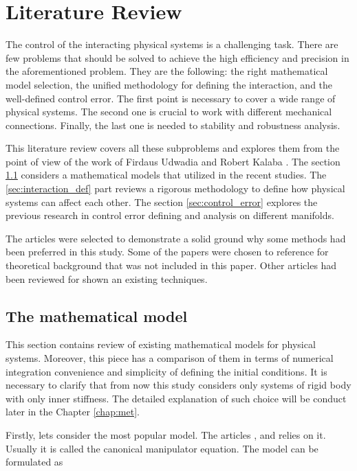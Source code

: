 \chapter{Literature Review}
\label{chap:lr}

The control of the interacting physical systems is a challenging 
task. There are few problems that should be solved to achieve the 
high efficiency and precision in the aforementioned problem. They 
are the following: the right mathematical model selection, the 
unified methodology for defining the interaction, and the well-defined 
control error. The first point is necessary to cover a wide range 
of physical systems. The second one is crucial to work with 
different mechanical connections. Finally, the last one is needed 
to stability and robustness analysis. 

This literature review covers all these subproblems and explores them
from the point of view of the work of Firdaus Udwadia and Robert Kalaba 
\cite{UdwadiaKalabaApproach}. The section \ref{sec:math_model} considers 
a mathematical models that utilized in the recent studies. The 
\ref{sec:interaction_def} part reviews a rigorous methodology to define 
how physical systems can affect each other. The section \ref{sec:control_error} 
explores the previous research in control error defining and analysis 
on different manifolds.

The articles were selected to demonstrate a solid ground why some methods 
had been preferred in this study. Some of the papers were chosen 
to reference for theoretical background that was not included in this 
paper. Other articles had been reviewed for shown an existing techniques.

\section{The mathematical model} \label{sec:math_model}

This section contains review of existing mathematical models for physical 
systems. Moreover, this piece has a comparison of them in terms of numerical 
integration convenience and simplicity of defining the initial conditions. 
It is necessary to clarify that from now this study considers only systems 
of rigid body with only inner stiffness. The detailed explanation of 
such choice will be conduct later in the Chapter \ref{chap:met}.

Firstly, lets consider the most popular model. The articles 
\cite{UdwadiaKalabaApproach}, \cite{AppOfUdwadiaKalabaApproach} and 
\cite{UnifiedFrameworkOfRobotControl} relies on it. Usually it is 
called the canonical manipulator equation. The model can be formulated 
as 

